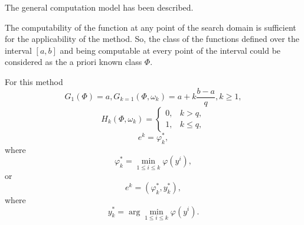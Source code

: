 The general computation model has been described. 


The computability of the function at any point of the search domain is sufficient for the applicability of the method. So, the class of the functions defined over the interval $[a,b]$ and being computable at every point of the interval could be considered as the a priori known class $\Phi$. 

For this method
\begin{displaymath}
G_1(\Phi)=a, G_{k=1}(\Phi,\omega_k)=a+k\frac{b-a}{q}, k\geq 1,
\end{displaymath}
\begin{displaymath}
  H_k(\Phi,\omega_k) =
  \begin{cases}
    0, & k > q, \\
    1, & k \leq q,
  \end{cases}
\end{displaymath}
\begin{equation}
\label{eq:18}
e^k=\varphi_k^*,
\end{equation}
where
\begin{equation}
\label{eq:19}
\varphi_k^*=\min_{1\leq i\leq k} \varphi(y^i),
\end{equation}
or
\begin{displaymath}
e^k=(\varphi_k^*,y_k^*),
\end{displaymath}
where 
\begin{displaymath}
\label{eq:19}
y_k^*=\arg \min_{1\leq i\leq k} \varphi(y^i).
\end{displaymath}


